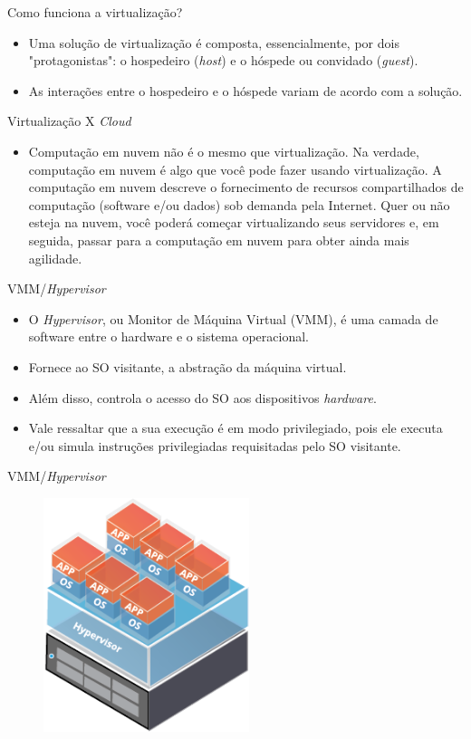 \documentclass{beamer}
\begin{document}
\begin{frame}{Como funciona a virtualização?}
\begin{itemize}
\item Uma solução de virtualização é composta, essencialmente, por dois "protagonistas": o hospedeiro ({\it host}) e o hóspede ou convidado ({\it guest}).
\item As interações entre o hospedeiro e o hóspede variam de acordo com a solução.
\end{itemize}
\end{frame}

\begin{frame}{Virtualização X {\it Cloud}}
\begin{itemize}
  \item Computação em nuvem não é o mesmo que virtualização. Na verdade, computação em nuvem é algo
que você pode fazer usando virtualização. A computação em nuvem descreve o fornecimento de
recursos compartilhados de computação (software e/ou dados) sob demanda pela Internet. Quer ou não
esteja na nuvem, você poderá começar virtualizando seus servidores e, em seguida, passar para a
computação em nuvem para obter ainda mais agilidade.
\end{itemize}
\end{frame}

\begin{frame}{VMM/{\it Hypervisor}}
\begin{itemize}
 \item O {\it Hypervisor}, ou Monitor de Máquina Virtual (VMM), é uma camada de software entre o hardware e o sistema operacional.
 \item Fornece ao SO visitante, a abstração da máquina virtual.
 \item Além disso, controla o acesso do SO aos dispositivos {\it hardware}.
 \item Vale ressaltar que a sua execução é em modo privilegiado, pois ele executa e/ou simula instruções privilegiadas requisitadas pelo SO visitante. 
\end{itemize}
\end{frame}

\begin{frame}{VMM/{\it Hypervisor}}
\begin{figure}[hbtp]
\centering
\includegraphics[width=6cm]{Images/hypervisor.png}
\label{figRotulo}
\end{figure}
\end{frame}
\end{document}
